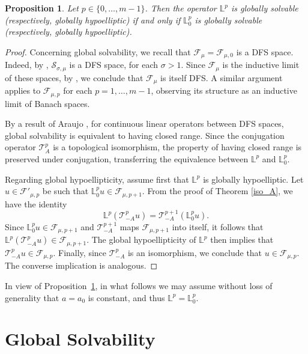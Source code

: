 \documentclass[12pt,reqno]{amsart}
\newtheorem{proposition}[theorem]{Proposition}
\theoremstyle{definition}
\numberwithin{equation}{section}
\begin{document}
\begin{proposition}\label{equiv_L0}
	Let $p \in \{0, \ldots, m - 1\}$. Then 
the operator $\mathbb{L}^p$ is globally solvable (respectively, globally hypoelliptic) if and only if $\mathbb{L}_0^p$ is globally solvable (respectively, globally hypoelliptic).
\end{proposition}
\begin{proof}
	Concerning global solvability, we recall that $\mathscr{F}_\mu = \mathscr{F}_{\mu,0}$ is a DFS space. Indeed, by \cite[Theorem 2.4]{KowTok}, $\mathcal{S}_{\sigma,\mu}$ is a DFS space, for each $\sigma>1$. Since $\mathscr{F}_\mu$ is the inductive limit of these spaces, by \cite{Komatsu1967}, we conclude that $\mathscr{F}_\mu$ is itself DFS. A similar argument applies to $\mathscr{F}_{\mu,p}$ for each $p = 1, \ldots, m-1$, observing its structure as an inductive limit of Banach spaces.
	
	By a result of Araujo \cite[Lemma 2.2]{Araujo2017}, for continuous linear operators between DFS spaces, global solvability is equivalent to having closed range. Since the conjugation operator $\mathscr{T}_A^p$ is a topological isomorphism, the property of having closed range is preserved under conjugation, transferring the equivalence between $\mathbb{L}^p$ and $\mathbb{L}_0^p$.
	
	Regarding global hypoellipticity, assume first that $\mathbb{L}^p$ is globally hypoelliptic. Let $u \in \mathscr{F}'_{\mu,p}$ be such that $\mathbb{L}_0^p u \in \mathscr{F}_{\mu,p+1}$. From the proof of Theorem \ref{iso_A}, we have the identity
	\[
	\mathbb{L}^p (\mathscr{T}_{-A}^p u) = \mathscr{T}_{-A}^{p+1} (\mathbb{L}_0^p u).
	\]
	Since $\mathbb{L}_0^p u \in \mathscr{F}_{\mu,p+1}$ and $\mathscr{T}_{-A}^{p+1}$ maps $\mathscr{F}_{\mu,p+1}$ into itself, it follows that $\mathbb{L}^p (\mathscr{T}_{-A}^p u) \in \mathscr{F}_{\mu,p+1}$. The global hypoellipticity of $\mathbb{L}^p$ then implies that $\mathscr{T}_{-A}^p u \in \mathscr{F}_{\mu,p}$. Finally, since $\mathscr{T}_{-A}^p$ is an isomorphism, we conclude that $u \in \mathscr{F}_{\mu,p}$. The converse implication is analogous.
\end{proof}

In view of Proposition~\ref{equiv_L0}, in what follows we may assume without loss of generality that $a = a_0$ is constant, and thus $\mathbb{L}^p = \mathbb{L}_0^p$.


\section{Global Solvability}\label{sec-solvability}
\end{document}

